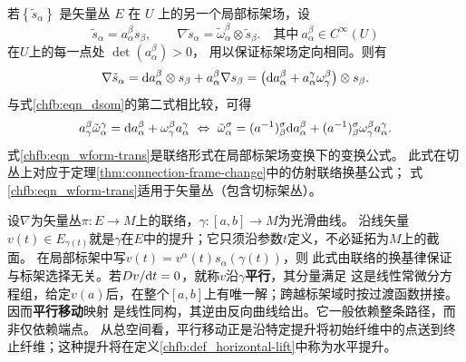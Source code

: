 若$\left\{\tilde{s}_\alpha\right\}$ 是矢量丛 $E$ 在 $U$ 上的另一个局部标架场，设
\begin{equation}\label{chfb:eqn_dsom}
    \tilde{s}_\alpha=a_{\alpha}^\beta s_\beta, \qquad
    \nabla \tilde{s}_\alpha=\tilde{\omega}_{\alpha}^\beta\otimes\tilde{s}_\beta .
    \quad \text{其中}\ a_{\alpha}^\beta \in C^{\infty}(U)
\end{equation}
在$U$上的每一点处 $\operatorname{det}\left(a_{\alpha}^\beta\right) > 0$，
用以保证标架场定向相同。则有
\begin{equation}
    \nabla \tilde{s}_\alpha=\dd a_{\alpha}^\beta\otimes s_\beta
    +a_{\alpha}^\beta \nabla s_\beta
    =\left(\dd a_{\alpha}^\beta
    +a_{\alpha}^\gamma \omega_{\gamma}^\beta\right)\otimes s_\beta .
\end{equation}
与式\eqref{chfb:eqn_dsom}的第二式相比较，可得
\begin{equation}\label{chfb:eqn_wform-trans}
	a_{\gamma}^\beta \tilde{\omega}_{\alpha}^\gamma
	=\dd a_{\alpha}^\beta +
	\omega_{\gamma}^\beta a_{\alpha}^\gamma
	\ \Leftrightarrow \
	\tilde{\omega}_{\alpha}^\sigma=(a^{-1})_{\beta}^{\sigma}
	\dd a_{\alpha}^\beta+(a^{-1})_{\beta}^{\sigma}
	\omega_{\gamma}^\beta a_{\alpha}^\gamma .
\end{equation}
式\eqref{chfb:eqn_wform-trans}是联络形式在局部标架场变换下的变换公式。
此式在切丛上对应于定理\ref{thm:connection-frame-change}中的仿射联络换基公式；
式\eqref{chfb:eqn_wform-trans}适用于矢量丛（包含切标架丛）。

\begin{example}[沿曲线的平行移动]\label{chfb:eg_parallel-lift}
    设$\nabla$为矢量丛$\pi:E\to M$上的联络，$\gamma:[a,b]\to M$为光滑曲线。
    沿线矢量$v(t)\in E_{\gamma(t)}$就是$\gamma$在$E$中的提升；它只须沿参数$t$定义，不必延拓为$M$上的截面。
    在局部标架中写$v(t)=v^\alpha(t)s_\alpha(\gamma(t))$，则
    此式由联络的换基律保证与标架选择无关。若$D v/\dd t=0$，就称$v$沿$\gamma$\textbf{平行}，其分量满足
    这是线性常微分方程组，给定$v(a)$后，在整个$[a,b]$上有唯一解；跨越标架域时按过渡函数拼接。
    因而\textbf{平行移动}映射
    是线性同构，其逆由反向曲线给出。它一般依赖整条路径，而非仅依赖端点。
    从总空间看，平行移动正是沿特定提升将初始纤维中的点送到终止纤维；这种提升将在定义\ref{chfb:def_horizontal-lift}中称为水平提升。
\end{example}

